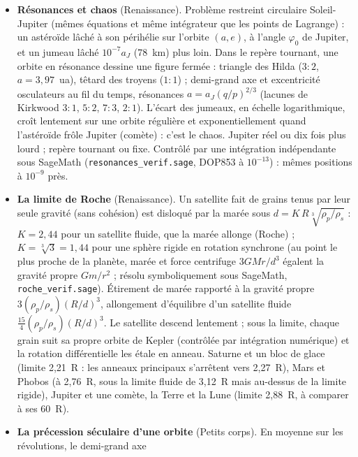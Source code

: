 \begin{itemize}
vers 13\,789 (4,8°), Kochab vers $-1100$. Le point vernal recule de $p$ par an le long des constellations de l'UAI :
il est entré dans les Poissons vers $-54$ et passera dans le Verseau en 2598. Recalculé par matrices de rotation
sous SageMath (\texttt{precession\_verif.sage}).
\item \textbf{Résonances et chaos} (Renaissance). Problème restreint circulaire Soleil-Jupiter (mêmes équations et
même intégrateur que les points de Lagrange) : un astéroïde lâché à son périhélie sur l'orbite $(a,e)$, à l'angle
$\varphi_0$ de Jupiter, et un jumeau lâché $10^{-7}a_J$ (78~km) plus loin. Dans le repère tournant, une orbite en
résonance dessine une figure fermée : triangle des Hilda ($3{:}2$, $a=3{,}97$~ua), têtard des troyens ($1{:}1$) ; demi-grand
axe et excentricité osculateurs au fil du temps, résonances $a=a_J(q/p)^{2/3}$ (lacunes de Kirkwood $3{:}1$, $5{:}2$, $7{:}3$, $2{:}1$).
L'écart des jumeaux, en échelle logarithmique, croît lentement sur une orbite régulière et exponentiellement quand
l'astéroïde frôle Jupiter (comète) : c'est le chaos. Jupiter réel ou dix fois plus lourd ; repère tournant ou fixe.
Contrôlé par une intégration indépendante sous SageMath (\texttt{resonances\_verif.sage}, DOP853 à $10^{-13}$) : mêmes
positions à $10^{-9}$ près.
\item \textbf{La limite de Roche} (Renaissance). Un satellite fait de grains tenus par leur seule gravité (sans
cohésion) est disloqué par la marée sous $d=K\,R\sqrt[3]{\rho_p/\rho_s}$ : $K=2{,}44$ pour un satellite fluide, que la
marée allonge (Roche) ; $K=\sqrt[3]3=1{,}44$ pour une sphère rigide en rotation synchrone (au point le plus proche de la
planète, marée et force centrifuge $3GMr/d^3$ égalent la gravité propre $Gm/r^2$ ; résolu symboliquement sous SageMath,
\texttt{roche\_verif.sage}). Étirement de marée rapporté à la gravité propre $3(\rho_p/\rho_s)(R/d)^3$, allongement
d'équilibre d'un satellite fluide $\tfrac{15}{4}(\rho_p/\rho_s)(R/d)^3$. Le satellite descend lentement ; sous la limite,
chaque grain suit sa propre orbite de Kepler (contrôlée par intégration numérique) et la rotation différentielle les
étale en anneau. Saturne et un bloc de glace (limite 2,21~R : les anneaux principaux s'arrêtent vers 2,27~R), Mars et
Phobos (à 2,76~R, sous la limite fluide de 3,12~R mais au-dessus de la limite rigide), Jupiter et une comète, la Terre
et la Lune (limite 2,88~R, à comparer à ses 60~R).
\item \textbf{La précession séculaire d'une orbite} (Petits corps). En moyenne sur les révolutions, le demi-grand axe

\end{itemize}
